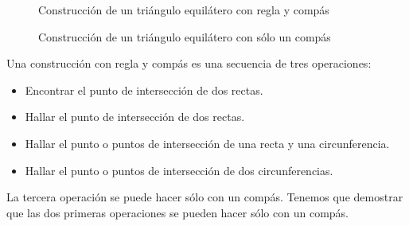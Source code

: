 \begin{figure}[ht]
\begin{minipage}{.45\textwidth}
\begin{center}
\caption{Construcción de un triángulo equilátero con regla y compás}\label{f.compass-equi}
\end{center}
\end{minipage}
\hfill
\begin{minipage}{.45\textwidth}
\begin{center}
\caption{Construcción de un triángulo equilátero con sólo un compás}\label{f.compass-equi-only}
\end{center}
\end{minipage}
\end{figure}

Una construcción con regla y compás es una secuencia de tres operaciones:
\begin{itemize}
\item Encontrar el punto de intersección de dos rectas.
\item Hallar el punto de intersección de dos rectas.
\item Hallar el punto o puntos de intersección de una recta y una circunferencia.
\item Hallar el punto o puntos de intersección de dos circunferencias.
\end{itemize}
La tercera operación se puede hacer sólo con un compás. Tenemos que demostrar que las dos primeras operaciones se pueden hacer sólo con un compás.

